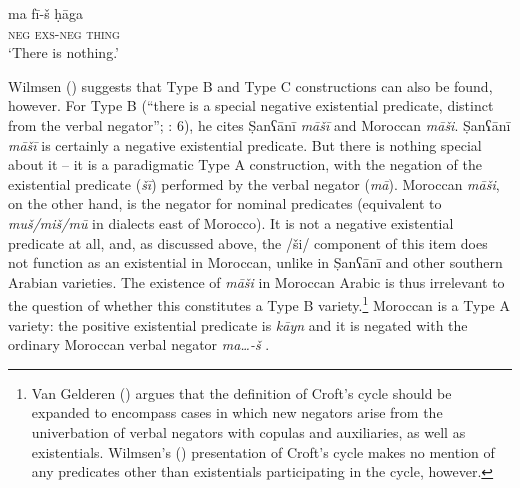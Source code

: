 \documentclass[output=paper]{langsci/langscibook}
\begin{document}
\ex\gll ma fī-š ḥāga\\
     \textsc{neg} \textsc{exs-neg} \textsc{\textup{thing}}\\
\glt  ‘There is nothing.’
\z
\z

Wilmsen (\citeyear[173–175]{Wilmsen2014}) suggests that Type B and Type C constructions can also be found, however. For Type B (“there is a special negative existential predicate, distinct from the verbal negator”; \citealt{Croft1991}: 6), he cites Ṣanʕānī \textit{māšī} and Moroccan \textit{māši}. Ṣanʕānī \textit{māšī} is certainly a negative existential predicate. But there is nothing special about it – it is a paradigmatic Type A construction, with the negation of the existential predicate (\textit{šī}) performed by the verbal negator (\textit{mā}). Moroccan \textit{māši}, on the other hand, is the negator for nominal predicates (equivalent to \textit{muš/miš/mū} in dialects east of Morocco). It is not a negative existential predicate at all, and, as discussed above, the /ši/ component of this item does not function as an existential in Moroccan, unlike in Ṣanʕānī and other southern Arabian varieties. The existence of \textit{m}\-\textit{āši} in Moroccan Arabic is thus irrelevant to the question of whether this constitutes a Type B variety.\footnote{Van Gelderen (\citeyear{VanGelderen2018}) argues that the definition of Croft’s cycle should be expanded to encompass cases in which new negators arise from the univerbation of verbal negators with copulas and auxiliaries, as well as existentials. Wilmsen's (\citeyear{Wilmsen2014}) presentation of Croft’s cycle makes no mention of any predicates other than existentials participating in the cycle, however.}  Moroccan is a Type A variety: the positive existential predicate is \textit{kāyn} and it is negated with the ordinary Moroccan verbal negator \textit{ma…-š} \citep{Caubet2011}. 
\end{document}
